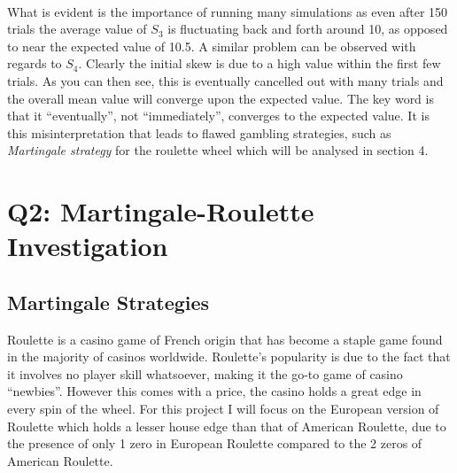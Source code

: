 \documentclass[12pt]{article}
\begin{document}
\\
What is evident is the importance of running many simulations as even after 150 trials the average value of $S_3$ is fluctuating back and forth around 10, as opposed to near the expected value of 10.5. A similar problem can be observed with regards to $S_4$. Clearly the initial skew is due to a high value within the first few trials. As you can then see, this is eventually cancelled out with many trials and the overall mean value will converge upon the expected value. The key word is that it “eventually”, not “immediately”, converges to the expected value. It is this misinterpretation that leads to flawed gambling strategies, such as \emph{Martingale strategy} for the roulette wheel which will be analysed in section 4.

\section{Q2: Martingale-Roulette Investigation}
\subsection{Martingale Strategies}
Roulette is a casino game of French origin that has become a staple game found in the majority of casinos worldwide. Roulette’s popularity is due to the fact that it involves no player skill whatsoever, making it the go-to game of casino “newbies”. However this comes with a price, the casino holds a great edge in every spin of the wheel. For this project I will focus on the European version of Roulette which holds a lesser house edge than that of American Roulette, due to the presence of only 1 zero in European Roulette compared to the 2 zeros of American Roulette.
\end{document}
